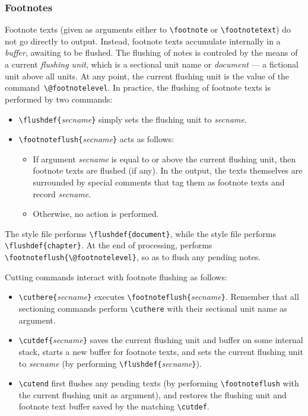 \subsubsection{Footnotes\label{hachafoot}}
%
%
Footnote texts (given as arguments either to \verb+\footnote+ or
\verb+\footnotetext+) do not go directly to output.
Instead, footnote texts accumulate internally in a \emph{buffer},
awaiting to be flushed.
The flushing of notes is controled by the means of a current
\emph{flushing unit}, which is a sectional unit name or
\textit{document} --- a fictional unit above all units.
At any point, the current flushing unit is the value of the
command~\verb+\@footnotelevel+.
In practice, the flushing of footnote texts is performed by two commands:
\begin{itemize}
\item \verb+\flushdef{+\textit{secname}\verb+}+ simply sets
the flushing unit to \textit{secname}.
\item \verb+\footnoteflush{+\textit{secname}\verb+}+ acts
as follows:
\begin{itemize}
\item If argument \textit{secname} is equal to or above the
current flushing unit, then footnote texts are flushed (if any).
In the output, the texts themselves are surrounded by special comments
that tag them as footnote texts and record \textit{secname}.
\item Otherwise, no action is performed.
\end{itemize}
\end{itemize}
The  style file performs \verb+\flushdef{document}+,
while the  style file performs  \verb+\flushdef{chapter}+.
At the end of processing, \verb++ performs
\verb+\footnoteflush{\@footnotelevel}+, so as to flush any pending notes.

Cutting commands interact with footnote flushing as follows:
\begin{itemize}
\item \verb+\cuthere{+\textit{secname}\verb+}+
executes \verb+\footnoteflush{+\textit{secname}\verb+}+.
Remember that all sectioning commands perform
\verb+\cuthere+ with their sectional unit name as argument.
\item \verb+\cutdef{+\textit{secname}\verb+}+
saves the current flushing unit and  buffer on some internal stack,
starts a new buffer for footnote texts, and
sets the current flushing unit to \textit{secname}
(by performing \verb+\flushdef{+\textit{secname}\verb+}+).
\item \verb+\cutend+ first flushes any pending texts
(by performing \verb+\footnoteflush+ with the current flushing unit
as argument), and restores the flushing unit and footnote text buffer saved
by the matching \verb+\cutdef+.
\end{itemize}

